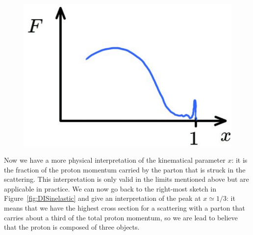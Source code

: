 \documentclass[12pt]{article}
\begin{document}
\begin{figure}
\begin{center}
\includegraphics[scale=0.25]{images/DISinelastic3.png}
\end{center}
\end{figure}
Now we have a more physical interpretation of the kinematical parameter $x$: it is the fraction of the proton momentum carried by the parton that is struck in the scattering. This interpretation is only valid in the limits mentioned above but are applicable in practice. We can now go back to the right-most sketch in Figure~\ref{fig:DISinelastic} and give an interpretation of the peak at $x\simeq 1/3$: it means that we have the highest cross section for a scattering with a parton that carries about a third of the total proton momentum, so we are lead to believe that the proton is composed of three objects.
\end{document}
